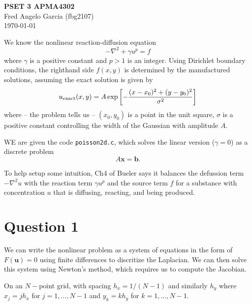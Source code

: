 \documentclass[12pt]{article}
\begin{document}
\begin{flushleft}
\textbf{PSET 3 APMA4302} \\
Fred Angelo Garcia (fbg2107) \\
\today
\end{flushleft}

\vspace{0.1in}

We know the nonlinear reaction-diffusion equation
\begin{equation}
- \nabla^2 + \gamma u^p = f
\end{equation}
where $\gamma$ is a positive constant and $p>1$ is an integer. Using Dirichlet boundary conditions, the righthand side $f(x,y)$ is determined by the manufactured solutions, assuming the exact solution is given by
\begin{equation}
    u_{\rm exact}(x,y) = A \exp\left[-\frac{(x-x_0)^2 + (y-y_0)^2}{\sigma^2}\right]
\end{equation}
where -- the problem tells us -- $(x_0, y_0)$ is a point in the unit square, $\sigma$ is a positive constant controlling the width of the Gaussian with amplitude $A$.

WE are given the code \texttt{poisson2d.c}, which solves the linear version ($\gamma = 0$) as a discrete problem
\begin{equation}
A \mathbf{x} = \mathbf{b}.
\end{equation}

To help setup some intuition, Ch4 of Bueler says it balances the defussion term $-\nabla^2 u$ with the reaction term $\gamma u^p$ and the source term $f$ for a substance with concentration $u$ that is diffusing, reacting, and being produced. 



\section{Question 1}

We can write the nonlinear problem as a system of equations in the form of $F(\mathbf{u}) = 0$ using finite differences to discritize the Laplacian. We can then solve this system using Newton's method, which requires us to compute the Jacobian.

On an $N-$point grid, with spacing $h_x= 1 / (N-1)$ and similarly $h_y$ where $x_j = j h_x$ for $j = 1, \ldots, N-1$ and $y_k = k h_y$ for $k = 1, \ldots, N-1$.
\end{document}
